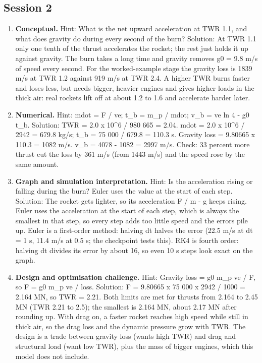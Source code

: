 \documentclass[11pt,a4paper]{article}
\begin{document}
\subsection*{Session 2}
\begin{enumerate}[nosep]
\item \textbf{Conceptual.} Hint: What is the net upward acceleration at TWR 1.1, and what does gravity do during every second of the burn? Solution: At TWR 1.1 only one tenth of the thrust accelerates the rocket; the rest just holds it up against gravity. The burn takes a long time and gravity removes g0 = 9.8 m/s of speed every second. For the worked-example stage the gravity loss is 1839 m/s at TWR 1.2 against 919 m/s at TWR 2.4. A higher TWR burns faster and loses less, but needs bigger, heavier engines and gives higher loads in the thick air: real rockets lift off at about 1.2 to 1.6 and accelerate harder later.
\item \textbf{Numerical.} Hint: mdot = F / ve; t\_b = m\_p / mdot; v\_b = ve ln 4 - g0 t\_b. Solution: TWR = 2.0 x 10\textasciicircum{}6 / 980 665 = 2.04. mdot = 2.0 x 10\textasciicircum{}6 / 2942 = 679.8 kg/s; t\_b = 75 000 / 679.8 = 110.3 s. Gravity loss = 9.80665 x 110.3 = 1082 m/s. v\_b = 4078 - 1082 = 2997 m/s. Check: 33 percent more thrust cut the loss by 361 m/s (from 1443 m/s) and the speed rose by the same amount.
\item \textbf{Graph and simulation interpretation.} Hint: Is the acceleration rising or falling during the burn? Euler uses the value at the start of each step. Solution: The rocket gets lighter, so its acceleration F / m - g keeps rising. Euler uses the acceleration at the start of each step, which is always the smallest in that step, so every step adds too little speed and the errors pile up. Euler is a first-order method: halving dt halves the error (22.5 m/s at dt = 1 s, 11.4 m/s at 0.5 s; the checkpoint tests this). RK4 is fourth order: halving dt divides its error by about 16, so even 10 s steps look exact on the graph.
\item \textbf{Design and optimisation challenge.} Hint: Gravity loss = g0 m\_p ve / F, so F = g0 m\_p ve / loss. Solution: F = 9.80665 x 75 000 x 2942 / 1000 = 2.164 MN, so TWR = 2.21. Both limits are met for thrusts from 2.164 to 2.45 MN (TWR 2.21 to 2.5); the smallest is 2.164 MN, about 2.17 MN after rounding up. With drag on, a faster rocket reaches high speed while still in thick air, so the drag loss and the dynamic pressure grow with TWR. The design is a trade between gravity loss (wants high TWR) and drag and structural load (want low TWR), plus the mass of bigger engines, which this model does not include.
\end{enumerate}
\end{document}
